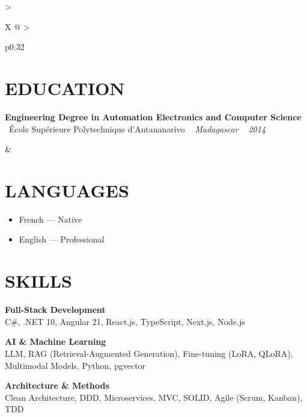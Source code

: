 \documentclass[10pt,a4paper]{article}
\begin{document}
\setlength{\tabcolsep}{0pt}
\begin{tabularx}{\textwidth}{
  >{\raggedright\arraybackslash}X
  @{\hspace{1cm}}
  >{\raggedright\arraybackslash}p{0.32\textwidth}
}
\begin{minipage}[t]{\linewidth}
\section*{EDUCATION}

\textbf{Engineering Degree in Automation Electronics and Computer Science}\\
\textcolor{primary}{ \faGraduationCap\ École Supérieure Polytechnique d'Antananarivo} \quad
\textit{ \small \textcolor{darkgray}{ \faMapMarker\ } Madagascar } \hfill  \textit{ \small \textcolor{darkgray}{ \faCalendar\ } 2014 }
\end{minipage}
&
\begin{minipage}[t]{\linewidth}

\section*{LANGUAGES}

\begin{itemize}
  \item French --- Native
  \item English --- Professional
\end{itemize}

\section*{SKILLS}

\textbf{\color{primary} Full-Stack Development}\\
\color{darkgray} C\#, .NET 10, Angular 21, React.js, TypeScript, Next.js, Node.js

\vspace{4pt}

\textbf{\color{primary} AI \& Machine Learning}\\
\color{darkgray} LLM, RAG (Retrieval-Augmented Generation), Fine-tuning (LoRA, QLoRA), Multimodal Models, Python, pgvector

\vspace{4pt}

\textbf{\color{primary} Architecture \& Methods}\\
\color{darkgray} Clean Architecture, DDD, Microservices, MVC, SOLID, Agile (Scrum, Kanban), TDD


\end{minipage}
\end{tabularx}
\end{document}

